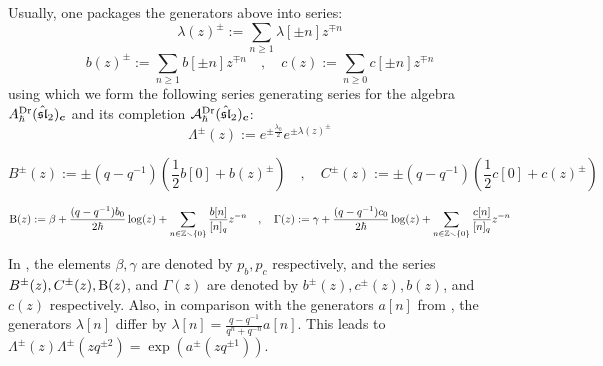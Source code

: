         Usually, one packages the generators above into series:
            $$\lambda(z)^{\pm} := \sum_{n \geq 1} \lambda[\pm n] z^{\mp n}$$
            $$
                b(z)^{\pm} := \sum_{n \geq 1} b[\pm n] z^{\mp n}
                \quad, \quad
                c(z) := \sum_{n \geq 0} c[\pm n] z^{\mp n}
            $$
        using which we form the following series generating series for the algebra $A_{\hbar}^{\mathrm{Dr}}(\hat{\mathfrak{sl}}_2)_{\boldsymbol{c}}$ and its completion $\mathcal{A}_{\hbar}^{\mathrm{Dr}}(\hat{\mathfrak{sl}}_2)_{\boldsymbol{c}}$:
            \begin{equation} \label{equation: q_deformed_affine_sl_2_oscillator_Lambda_generating_series}
                \Lambda^{\pm}(z) := e^{ \pm \frac{\lambda_0}{2} } e^{ \pm \lambda(z)^{\pm} }
            \end{equation}
            
            \begin{equation} \label{equation: q_deformed_affine_sl_2_oscillator_BC_generating_series}
                B^{\pm}(z) := \pm (q - q^{-1}) \left( \frac12 b[0] + b(z)^{\pm} \right)
                \quad, \quad
                C^{\pm}(z) := \pm (q - q^{-1}) \left( \frac12 c[0] + c(z)^{\pm} \right)
            \end{equation}
            
            \begin{equation} \label{equation: quatum_affine_sl_2_oscillator_Theta_Gamma_generating_series}
                \mathrm{B}(z) := \beta + \frac{(q - q^{-1}) b_0}{2\hbar} \log(z) + \sum_{n \in \mathbb{Z} \smallsetminus \{0\}} \frac{b[n]}{[n]_q} z^{-n}
                \quad, \quad
                \Gamma(z) := \gamma + \frac{(q - q^{-1}) c_0}{2\hbar} \log(z) + \sum_{n \in \mathbb{Z} \smallsetminus \{0\}} \frac{c[n]}{[n]_q} z^{-n}
            \end{equation}
        \begin{remark}
            In \cite{frenkel_reshetikhin_affine_QUEs_and_deformed_virasoro_and_finite_W_algebras}, the elements $\beta, \gamma$ are denoted by $p_b, p_c$ respectively, and the series $B^{\pm}(z), C^{\pm}(z), \mathrm{B}(z)$, and $\Gamma(z)$ are denoted by $b^{\pm}(z), c^{\pm}(z), b(z)$, and $c(z)$ respectively. Also, in comparison with the generators $a[n]$ from \cite{awata_odake_shiraishi_free_boson_realisation_of_quantum_affine_sl_N}, the generators $\lambda[n]$ differ by $\lambda[n] = \frac{q - q^{-1}}{q^n + q^{-n}} a[n]$. This leads to $\Lambda^{\pm}(z) \Lambda^{\pm}(z q^{\pm 2}) = \exp\left( a^{\pm}( z q^{\pm 1} ) \right)$. 
        \end{remark}

